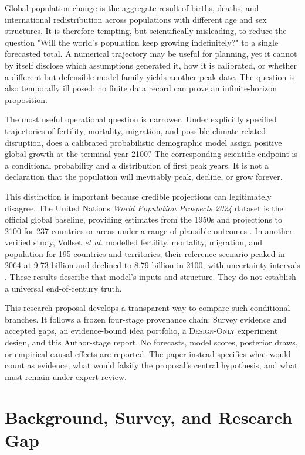 \documentclass[conference]{IEEEtran}
\newcommand{\designonly}{\textsc{Design-Only}}
\newcommand{\wpp}{\textit{World Population Prospects 2024}}
\begin{document}
Global population change is the aggregate result of births, deaths, and international redistribution across populations with different age and sex structures. It is therefore tempting, but scientifically misleading, to reduce the question "Will the world's population keep growing indefinitely?" to a single forecasted total. A numerical trajectory may be useful for planning, yet it cannot by itself disclose which assumptions generated it, how it is calibrated, or whether a different but defensible model family yields another peak date. The question is also temporally ill posed: no finite data record can prove an infinite-horizon proposition.

The most useful operational question is narrower. Under explicitly specified trajectories of fertility, mortality, migration, and possible climate-related disruption, does a calibrated probabilistic demographic model assign positive global growth at the terminal year 2100? The corresponding scientific endpoint is a conditional probability and a distribution of first peak years. It is not a declaration that the population will inevitably peak, decline, or grow forever.

This distinction is important because credible projections can legitimately disagree. The United Nations \wpp{} dataset is the official global baseline, providing estimates from the 1950s and projections to 2100 for 237 countries or areas under a range of plausible outcomes \cite{unwpp2024}. In another verified study, Vollset \textit{et al.} modelled fertility, mortality, migration, and population for 195 countries and territories; their reference scenario peaked in 2064 at 9.73 billion and declined to 8.79 billion in 2100, with uncertainty intervals \cite{vollset2020}. These results describe that model's inputs and structure. They do not establish a universal end-of-century truth.

This research proposal develops a transparent way to compare such conditional branches. It follows a frozen four-stage provenance chain: Survey evidence and accepted gaps, an evidence-bound idea portfolio, a \designonly{} experiment design, and this Author-stage report. No forecasts, model scores, posterior draws, or empirical causal effects are reported. The paper instead specifies what would count as evidence, what would falsify the proposal's central hypothesis, and what must remain under expert review.

\section{Background, Survey, and Research Gap}
\end{document}
